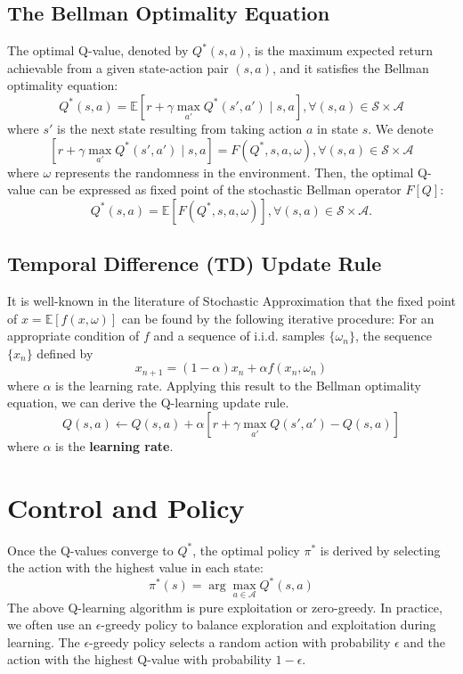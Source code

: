 \documentclass{article}
\begin{document}
\subsection{The Bellman Optimality Equation}
The optimal Q-value, denoted by $Q^*(s, a)$, is the maximum expected return achievable from a given state-action pair $(s, a)$, and it satisfies the Bellman optimality equation:
\begin{equation}
    Q^*(s, a) = \mathbb{E} \left[ r + \gamma \max_{a'} Q^*(s', a') \mid s, a \right], 
    \forall (s, a) \in \mathcal{S} \times \mathcal{A}
\end{equation}
where $s'$ is the next state resulting from taking action $a$ in state $s$.
We denote 
\begin{equation}
    \left[ r + \gamma\max_{a'} Q^*(s', a') \mid s, a \right] = F(Q^*, s, a, \omega),
    \forall (s, a) \in \mathcal{S} \times \mathcal{A}
\end{equation}
where $\omega$ represents the randomness in the environment. Then, the 
optimal Q-value can be expressed as fixed point of the stochastic Bellman operator $F[Q]$:
\begin{equation}
    Q^*(s, a) = \mathbb{E} \left[ F(Q^*, s, a, \omega) \right], \forall (s, a) \in \mathcal{S} \times \mathcal{A}.
\end{equation}

\subsection{Temporal Difference (TD) Update Rule}
It is well-known in the literature of Stochastic Approximation that 
the fixed point of $x = \mathbb E [f(x, \omega)]$ can be found 
by the following iterative procedure: For an appropriate condition 
of $f$ and a sequence of i.i.d. samples $\{\omega_n\}$, 
the sequence $\{x_n\}$ defined by
\begin{equation}
    x_{n+1} = (1 - \alpha) x_n + \alpha f(x_n, \omega_n)
\end{equation}
where $\alpha$ is the learning rate. Applying this result to
the Bellman optimality equation, we can derive the Q-learning update rule. 
\begin{equation}
    Q(s, a) \leftarrow Q(s, a) + \alpha \left[ r + \gamma \max_{a'} Q(s', a') - Q(s, a) \right]
\end{equation}
where $\alpha$ is the \textbf{learning rate}.

\section{Control and Policy}
Once the Q-values converge to $Q^*$, the optimal policy $\pi^*$ is derived by selecting the action with the highest value in each state:
\begin{equation}
    \pi^*(s) = \arg\max_{a \in \mathcal{A}} Q^*(s, a)
\end{equation}
The above Q-learning algorithm is pure exploitation or zero-greedy. 
In practice, we often use an $\epsilon$-greedy policy to
balance exploration and exploitation during learning. 
The $\epsilon$-greedy policy selects a random action with probability $\epsilon$ and the action with the highest Q-value with probability $1 - \epsilon$.
\end{document}
